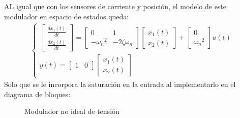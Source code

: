 \documentclass[a4paper, 10pt, onecolumn,journal]{ieeeconf}
\begin{document}
AL igual que con los sensores de corriente y posición, el modelo de este modulador en espacio de estados queda:
\begin{align}
	\begin{cases}
		\begin{bmatrix}
			\frac{d x_1(t)}{dt} \\ 
			\frac{d x_2(t)}{dt}
		\end{bmatrix} = 
		\begin{bmatrix}
			0 & 1 \\ 
			-{\omega_n}^2 & - 2 \zeta \omega_n
		\end{bmatrix}
		\begin{bmatrix}
			x_1(t) \\ 
			x_2(t)
		\end{bmatrix} + 
		\begin{bmatrix}
			0 \\
			{\omega_n}^2
		\end{bmatrix} u(t) \\
		y(t) = \begin{bmatrix}
			1 & 0
		\end{bmatrix} 
		\begin{bmatrix}
			x_1(t) \\ 
			x_2(t)
		\end{bmatrix}
	\end{cases}\label{ecuacion matricial de modulador de tension real}
\end{align}
Solo que se le incorpora la saturación en la entrada al implementarlo en el diagrama de bloques:
\begin{figure}[H]
	\centering
	\begin{adjustbox}{max width=\columnwidth}
	\end{adjustbox}
	\caption{Modulador no ideal de tensión}
	\label{Modulador no ideal de tensión}
\end{figure}
\end{document}
